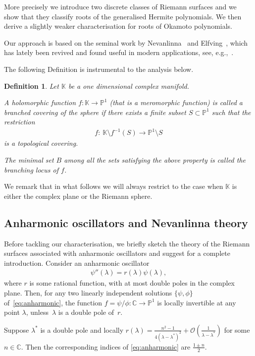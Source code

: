 \documentclass[pdftex]{sigma}
\numberwithin{equation}{section}
\newtheorem{Def}[thm]{Definition}
\newcommand{\bb}[1]{\mathbb{ #1 }}
\newcommand{\la}{\lambda}
\begin{document}
More precisely we introduce two discrete classes of Riemann surfaces and we show that they classify roots of the generalised Hermite polynomials. We then derive a slightly weaker characterisation for roots of Okamoto polynomials.

Our approach is based on the seminal work by Nevanlinna~\cite{nevanlinna32} and Elfving~\cite{elfving1934}, which has lately been revived and found useful in modern applications, see, e.g.,~\cite{eremenko,pibelyi}.

The following Def\/inition is instrumental to the analysis below.
\begin{Def}
Let $\bb{K}$ be a one dimensional complex manifold.

A holomorphic function $f\colon \bb{K} \to \bb{P}^1$ (that is a meromorphic function) is called a branched covering of the sphere if there
exists a f\/inite subset $S \subset \bb{P}^1$ such that the restriction
\begin{gather*}
f\colon \ \bb{K}\setminus f^{-1}(S) \to \bb{P}^1 \setminus S
\end{gather*}
is a topological covering.

The minimal set $B$ among all the sets satisfying the above property is called the branching locus of $f$.
\end{Def}
We remark that in what follows we will always restrict to the case when $\bb{K}$ is either the complex plane or the Riemann sphere.

\subsection{Anharmonic oscillators and Nevanlinna theory}
Before tackling our characterisation, we brief\/ly sketch the theory of the Riemann surfaces associated with anharmonic oscillators
and suggest \cite{pibelyi} for a complete introduction. Consider an anharmonic oscillator
\begin{gather}\label{eq:anharmonic}
\psi''(\lambda)=r(\lambda)\psi(\lambda),
\end{gather}
where $r$ is some rational function, with at most double poles in the complex plane. Then, for any two linearly independent solutions $\{\psi,\phi\}$ of~\eqref{eq:anharmonic}, the function $f=\psi/\phi \colon \bb{C} \to \bb{P}^1$ is locally invertible at any point $\la$, unless~$\la$ is a double pole of~$r$.

Suppose $\la^*$ is a double pole and locally $r(\la)=\frac{n^2-1}{4(\la-\la^*)^2}+\mathcal{O}(\frac{1}{\la-\la^*})$ for some $n \in \bb{C}$.
Then the corresponding indices of \eqref{eq:anharmonic} are $ \frac{1\pm n}{2}$.
\end{document}
